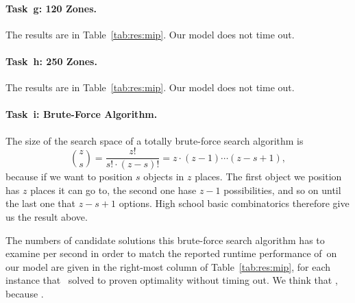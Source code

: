 \paragraph{Task~g: 120 Zones.}
The results are in Table~\ref{tab:res:mip}.
%
Our model does not time out.

\paragraph{Task~h: 250 Zones.}
The results are in Table~\ref{tab:res:mip}.
%
Our model does not time out. %

\paragraph{Task~i: Brute-Force Algorithm.}
The size of the search space of a totally brute-force search algorithm
is 
\begin{equation*}
\binom{z}{s} = \frac{z!}{s! \cdot (z-s)!}  = z \cdot (z-1) \cdots (z-s+1),
\end{equation*}
because if we want to position $s$ objects in $z$ places. The first object we position has $z$ places it can go to, the second one hase $z-1$ possibilities, and so on until the last one that $z - s + 1$ options. High school basic combinatorics therefore give us the result above.

The numbers of candidate solutions this brute-force search algorithm
has to examine per second in order to match the reported runtime
performance of~\SolverMIP on our model are given in the right-most
column of Table~\ref{tab:res:mip}, for each instance that~\SolverMIP
solved to proven optimality without timing out.
%
We think that \todo{\filler}, because \todo{\filler}.

